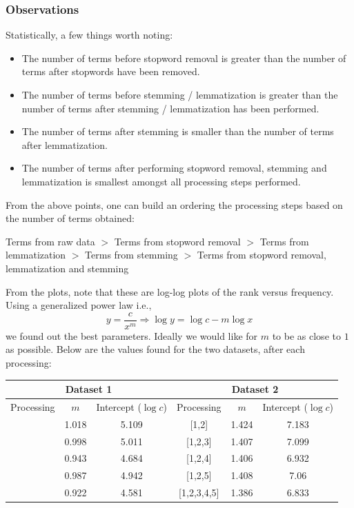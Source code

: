 \documentclass{article}
\begin{document}
\subsubsection{Observations}
\begin{flushleft}
Statistically, a few things worth noting:
\begin{itemize}
\item The number of terms before stopword removal is greater than the number of terms after stopwords have been removed.
\item The number of terms before stemming / lemmatization is greater than the number of terms after stemming / lemmatization has been performed.
\item The number of terms after stemming is smaller than the number of terms after lemmatization.
\item The number of terms after performing stopword removal, stemming and lemmatization is smallest amongst all processing steps performed.
\end{itemize}
From the above points, one can build an ordering the processing steps based on the number of terms obtained:
\begin{center}
Terms from raw data \(>\) Terms from stopword removal \(>\) Terms from lemmatization \(>\) Terms from stemming \(>\) Terms from stopword removal, lemmatization and stemming
\end{center}

From the plots, note that these are log-log plots of the rank versus frequency. Using a generalized power law i.e.,
\begin{equation}
\label{gen-zipf}
y = \frac{c}{x^{m}} \Rightarrow \log y = \log c - m \log x
\end{equation}
we found out the best parameters. Ideally we would like for \(m\) to be as close to \(1\) as possible. Below are the values found for the two datasets, after each processing:
\begin{center}
\begin{tabular}{|c|c|c|c|c|c|}
\hline
\multicolumn{3}{|c|}{Dataset 1} & \multicolumn{3}{|c|}{Dataset 2} \\
\hline
Processing & \(m\) & Intercept (\(\log c\)) & Processing & \(m\) & Intercept (\(\log c\)) \\
\hline
\hline
[1,2] & 1.018 & 5.109 & [1,2] & 1.424 & 7.183\\
\hline
[1,2,3] & 0.998 & 5.011 & [1,2,3] & 1.407 & 7.099\\
\hline
[1,2,4] & 0.943 & 4.684 & [1,2,4] & 1.406 & 6.932\\
\hline
[1,2,5] & 0.987 & 4.942 & [1,2,5] & 1.408 & 7.06\\
\hline
[1,2,3,4,5] & 0.922 & 4.581 & [1,2,3,4,5] & 1.386 & 6.833\\
\hline
\end{tabular}
\end{center}


\end{flushleft}
\end{document}

